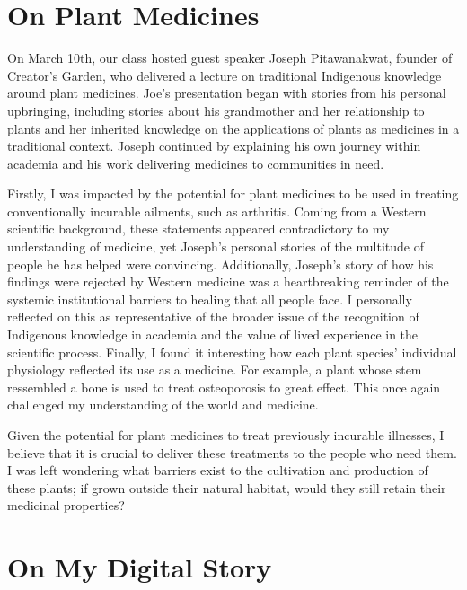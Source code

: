 \documentclass{report}
\begin{document}

\section{On Plant Medicines}


\hspace{24pt} On March 10th, our class hosted guest speaker Joseph Pitawanakwat, founder of Creator's Garden, who delivered a lecture on traditional Indigenous knowledge around plant medicines.
Joe's presentation began with stories from his personal upbringing, including stories about his grandmother and her relationship to plants and her inherited knowledge on the applications of plants as medicines in a traditional context. 
Joseph continued by explaining his own journey within academia and his work delivering medicines to communities in need.

\hspace{24pt} Firstly, I was impacted by the potential for plant medicines to be used in treating conventionally incurable ailments, such as arthritis. Coming from a Western scientific background, these statements appeared contradictory to my understanding of medicine, yet Joseph's personal stories of the multitude of people he has helped were convincing.
Additionally, Joseph's story of how his findings were rejected by Western medicine was a heartbreaking reminder of the systemic institutional barriers to healing that all people face. I personally reflected on this as representative of the broader issue of the recognition of Indigenous knowledge in academia and the value of lived experience in the scientific process.
Finally, I found it interesting how each plant species' individual physiology reflected its use as a medicine. For example, a plant whose stem ressembled a bone is used to treat osteoporosis to great effect. This once again challenged my understanding of the world and medicine.

\hspace{24pt} Given the potential for plant medicines to treat previously incurable illnesses, I believe that it is crucial to deliver these treatments to the people who need them. I was left wondering what barriers exist to the cultivation and production of these plants; if grown outside their natural habitat, would they still retain their medicinal properties?

\section{On My Digital Story}
\end{document}
